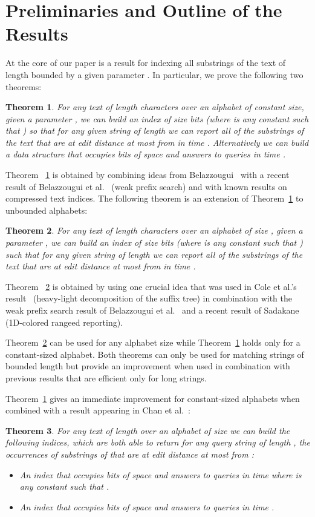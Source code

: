 \documentclass{article}
\newcommand{\?}{\mskip1.5mu}
\newtheorem{theorem}{Theorem}
\begin{document}
\section{Preliminaries and Outline of the Results}
At the core of our paper is a result for indexing all substrings of the text of length bounded by a given parameter . In particular, we prove the following two theorems: 
\begin{theorem}
\label{constant_fix_theorem}
For any text  of length  characters over an alphabet of constant size, given a parameter , we can build an index of size  bits  (where  is any constant such that ) so that for any given string  of length  we can report all of the  substrings of the text that are at edit distance at most  from  in time . Alternatively we can build a data structure that occupies  bits of space and answers to queries in time . 
\end{theorem}
Theorem ~\ref{constant_fix_theorem} is obtained by combining ideas from Belazzougui~\cite{B09} with a recent result of Belazzougui et al.~\cite{BBPV10} (weak prefix search) and with known results on compressed text indices. 
The following theorem is an extension of Theorem~\ref{constant_fix_theorem} to unbounded alphabets:  
\begin{theorem}
\label{arb_fix_theorem}
For any text  of length  characters over an alphabet of size , given a parameter , we can build an index of size  bits (where  is any constant such that ) such that for any given string  of length  we can report all of the  substrings of the text that are at edit distance at most  from  in time . 
\end{theorem}
Theorem ~\ref{arb_fix_theorem} is obtained by using one crucial idea that was used in Cole et al.'s result~\cite{CGL04} (heavy-light decomposition of the suffix tree) in combination with the weak prefix search result of Belazzougui et al.~\cite{BBPV10} and a recent result of Sadakane~\cite{Sa07} (1D-colored rangeed reporting). 

Theorem~\ref{arb_fix_theorem} can be used for any alphabet size while Theorem~\ref{constant_fix_theorem} holds only for a constant-sized alphabet. Both theorems can only be used for matching strings of bounded length but provide an improvement when used in combination with previous results that are efficient only for long strings.


Theorem~\ref{constant_fix_theorem} gives an immediate improvement for constant-sized alphabets when combined with a result appearing in Chan et al.~\cite{chan2011linear}:
\begin{theorem}
\label{full_constant_theorem}
For any text  of length  over an alphabet of size  we can build the following indices, which are both able to return for any query string  of length , the  occurrences of substrings of  that are at edit distance at most  from :
\begin{itemize}
\item An index that occupies  bits of space and answers to queries in time  where  is any constant such that . 
\item An index that occupies  bits of space and answers to queries in time . 
\end{itemize}
\end{theorem}
\end{document}
